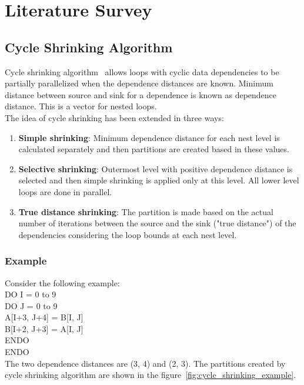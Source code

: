 \chapter{Literature Survey}
\section{Cycle Shrinking Algorithm}

Cycle shrinking algorithm~\cite{cycle1} allows loops with cyclic data dependencies to be partially parallelized when the dependence distances are known. Minimum distance between source and sink for a dependence is known as dependence distance. This is a vector for nested loops. \\

The idea of cycle shrinking has been extended in three ways: \\
\begin{enumerate}
\item {\bf Simple shrinking}: Minimum dependence distance for each nest level is calculated separately and then partitions are created based in these values. 
\item {\bf Selective shrinking}: Outermost level with positive dependence distance is selected and then simple shrinking is applied only at this level. All lower level loops are done in parallel. 
\item {\bf True distance shrinking}: The partition is made based on the actual number of iterations between the source and the sink ("true distance") of the dependencies considering the loop bounds at each nest level. 
\end{enumerate}

\subsection{Example}
Consider the following example: \\
DO I = 0 to 9 \\
\indent DO J = 0 to 9 \\
\indent \indent A[I+3, J+4] = B[I, J] \\
\indent \indent B[I+2, J+3] = A[I, J] \\
\indent ENDO \\
ENDO \\

The two dependence distances are (3, 4) and (2, 3). The partitions created by cycle shrinking algorithm are shown in the figure~\ref{fig:cycle_shrinking_example}. \\


